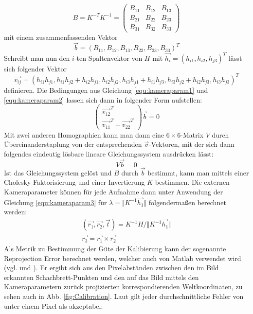 \begin{equation}
	B = K^{-T}K^{-1} = \begin{pmatrix}
			B_{11} & B_{12} & B_{13} \\
			B_{21} & B_{22} & B_{23} \\
			B_{31} & B_{32} & B_{33}
		\end{pmatrix}
\end{equation}
mit einem zusammenfassenden Vektor
\begin{equation}
	\vec{b} = \left( B_{11}, B_{12}, B_{13}, B_{22}, B_{23}, B_{33} \right)^T
\end{equation}
Schreibt man nun den \(i\)-ten Spaltenvektor von \(H\) mit \(\vec{h_i} = \left( h_{i1}, h_{i2}, h_{j3} \right)^T\) lässt sich folgender Vektor 
\begin{equation}
	\vec{v_{ij}} = \left( h_{i1}h_{j1}, h_{i1}h_{j2}+h_{i2}h_{j1}, h_{i2}h_{j2},h_{i3}h_{j1}+h_{i1}h_{j3}, h_{i3}h_{j2}+h_{i2}h_{j3},h_{i3}h_{j3}\right)^T
\end{equation}
definieren. Die Bedingungen aus Gleichung \ref{equ:kameraparam1} und \ref{equ:kameraparam2} lassen sich dann in folgender Form aufstellen:
\begin{equation}
	\left( \begin{array}{c}\vec{v_{12}}^T\\\vec{v_{11}}^T - \vec{v_{22}}^T\end{array} \right)\vec{b} = 0
\end{equation}
Mit zwei anderen Homographien kann man dann eine \(6 \times 6\)-Matrix \(V\) durch Übereinanderstaplung von der entsprechenden \(\vec{v}\)-Vektoren, mit der sich dann folgendes eindeutig lösbare lineare Gleichungssystem ausdrücken lässt:
\begin{equation}
	V\vec{b} = 0
\end{equation}
Ist das Gleichungssystem gelöst und \(B\) durch \(\vec{b}\) bestimmt, kann man mittels einer Cholesky-Faktorisierung und einer Invertierung \(K\) bestimmen. Die externen Kameraparameter können für jede Aufnahme dann unter Anwendung der Gleichung \ref{equ:kameraparam3} für \(\lambda = \Vert K^{-1}\vec{h_1} \Vert\) folgendermaßen berechnet werden:
\begin{gather}
	\left(\vec{r_1},\vec{r_2},\vec{t}\right) = K^{-1}H \slash \Vert K^{-1}\vec{h_1} \Vert \\
	\vec{r_3} = \vec{r_1} \times \vec{r_2}
\end{gather}
Als Metrik zu Bestimmung der Güte der Kalibierung kann der sogenannte Reprojection Error berechnet werden, welcher auch von Matlab verwendet wird (vgl. \cite{Mathworks:17a} und \cite{StackOverflow:15}). Er ergibt sich aus den Pixelabständen zwischen den im Bild erkannten Schachbrett-Punkten und den auf das Bild mittels den Kameraparametern zurück projizierten korrespondierenden Weltkoordinaten, zu sehen auch in Abb. \ref{fig:Calibration}. Laut \cite{Mathworks:17a} gilt jeder durchschnittliche Fehler von unter einem Pixel als akzeptabel:

